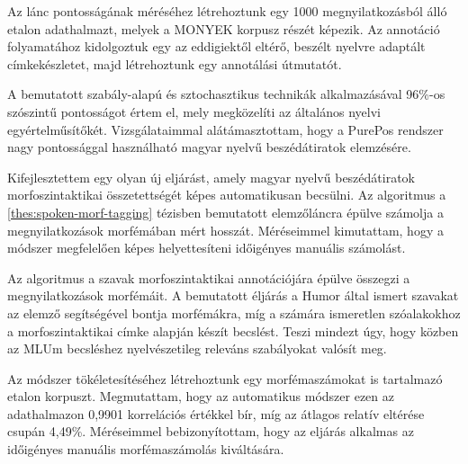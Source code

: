 Az  lánc pontosságának méréséhez létrehoztunk egy 1000 megnyilatkozásból álló etalon adathalmazt, melyek a MONYEK \cite{Matyus2014} korpusz részét képezik. 
Az annotáció folyamatához kidolgoztuk egy az eddigiektől eltérő, beszélt nyelvre adaptált címkekészletet, majd létrehoztunk egy annotálási útmutatót.

A bemutatott szabály-alapú és sztochasztikus technikák alkalmazásával 96\%-os szószintű pontosságot értem el, mely megközelíti az általános nyelvi egyértelműsítőkét.
Vizsgálataimmal alátámasztottam, hogy a PurePos rendszer nagy pontossággal használható magyar nyelvű beszédátiratok elemzésére. 


\thesisline%


\begin{core}
\begin{thesis}
\label{thes:mlu-estimation}
Kifejlesztettem egy olyan új eljárást, amely magyar nyelvű beszédátiratok morfoszintaktikai összetettségét képes automatikusan becsülni.
Az algoritmus a \ref{thes:spoken-morf-tagging} tézisben bemutatott elemzőláncra épülve számolja a megnyilatkozások morfémában mért hosszát. 
Méréseimmel kimutattam, hogy a módszer megfelelően képes helyettesíteni időigényes manuális számolást.
\end{thesis}

\begin{pub}
\cite{Matyus2014,Orosz2014c}
\end{pub}
\end{core}

Az algoritmus a szavak morfoszintaktikai annotációjára épülve összegzi a megnyilatkozások morfémáit.
A bemutatott éljárás a Humor által ismert szavakat az elemző segítségével bontja morfémákra, míg a számára ismeretlen szóalakokhoz a morfoszintaktikai címke alapján készít becslést.
Teszi mindezt úgy, hogy közben az MLUm becsléshez nyelvészetileg releváns szabályokat valósít meg.

Az módszer tökéletesítéséhez létrehoztunk egy morfémaszámokat is tartalmazó etalon korpuszt. 
Megmutattam, hogy az automatikus módszer ezen az adathalmazon 0,9901 korrelációs értékkel bír, míg az átlagos relatív eltérése csupán 4,49\%. 
Méréseimmel bebizonyítottam, hogy az eljárás alkalmas az időigényes manuális morfémaszámolás kiváltására.

